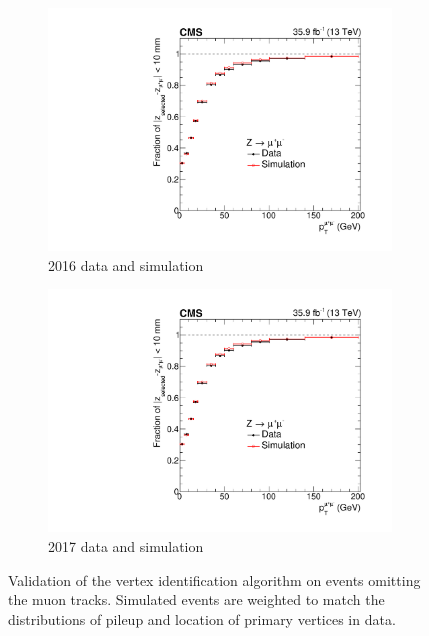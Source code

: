 \begin{figure}[h!]
  \centering
  \begin{subfigure}{0.49\textwidth}
    \includegraphics[width=\textwidth]{Figures/Objects/vtxid_2016}
    \caption{2016 data and simulation}
    \label{fig:obj_vtxid_2016}
  \end{subfigure}
  \begin{subfigure}{0.49\textwidth}
    \includegraphics[width=\textwidth]{Figures/Objects/vtxid_2016}
    \caption{2017 data and simulation}
    \label{fig:obj_vtxid_2016}
  \end{subfigure}
  \caption{
  Validation of the \Hgg vertex identification algorithm on \Zmumu events
  omitting the muon tracks. Simulated events are weighted to match the distributions of pileup
  and location of primary vertices in data.
  }
  \label{fig:obj_vtxid}
\end{figure}

